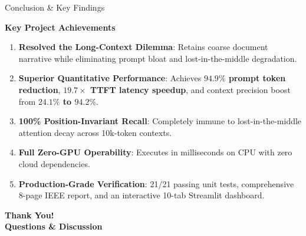 \documentclass[10pt,aspectratio=169]{beamer}
\begin{document}
\begin{frame}{Conclusion \& Key Findings}
    \begin{block}{\textbf{Key Project Achievements}}
        \begin{enumerate}\setlength\itemsep{2pt}
            \item \textbf{Resolved the Long-Context Dilemma}: Retains coarse document narrative while eliminating prompt bloat and lost-in-the-middle degradation.
            \item \textbf{Superior Quantitative Performance}: Achieves \textbf{$94.9\%$ prompt token reduction}, \textbf{$19.7\times$ TTFT latency speedup}, and context precision boost from \textbf{$24.1\%$ to $94.2\%$}.
            \item \textbf{100\% Position-Invariant Recall}: Completely immune to lost-in-the-middle attention decay across 10k-token contexts.
            \item \textbf{Full Zero-GPU Operability}: Executes in milliseconds on CPU with zero cloud dependencies.
            \item \textbf{Production-Grade Verification}: 21/21 passing unit tests, comprehensive 8-page IEEE report, and an interactive 10-tab Streamlit dashboard.
        \end{enumerate}
    \end{block}
    
    \vspace{0.25cm}
    \begin{center}
        \Huge \textbf{Thank You!} \\
        \vspace{0.15cm}
        \normalsize \textbf{Questions \& Discussion}
    \end{center}
\end{frame}
\end{document}
